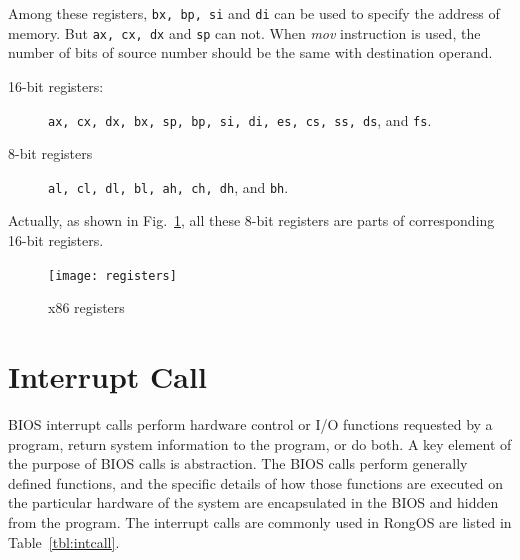 \documentclass{swfcthesis}
\begin{document}
Among these registers, \texttt{bx, bp, si} and \texttt{di} can be used to specify the
address of memory. But \texttt{ax, cx, dx} and \texttt{sp} can not. When \emph{mov}
instruction is used, the number of bits of source number should be the same with
destination operand.

\begin{description}
\item[16-bit registers:] \texttt{ax, cx, dx, bx, sp, bp, si, di, es, cs, ss, ds}, and \texttt{fs}.
\item[8-bit registers] \texttt{al, cl, dl, bl, ah, ch, dh}, and \texttt{bh}.
\end{description}
Actually, as shown in Fig.~\ref{fig:regs}, all these 8-bit registers are parts of
corresponding 16-bit registers.

\begin{figure}[!htbp]
  \centering
  \begin{center}
    \texttt{[image: registers]}
  \end{center}
  \caption{x86 registers}
  \label{fig:regs}
\end{figure}

\section{Interrupt Call}

BIOS interrupt calls perform hardware control or I/O functions requested by a program,
return system information to the program, or do both. A key element of the purpose of BIOS
calls is abstraction. The BIOS calls perform generally defined functions, and the specific
details of how those functions are executed on the particular hardware of the system are
encapsulated in the BIOS and hidden from the program\cite{wiki:bios-int}. The interrupt
calls are commonly used in RongOS are listed in Table~\ref{tbl:intcall}.
\end{document}
